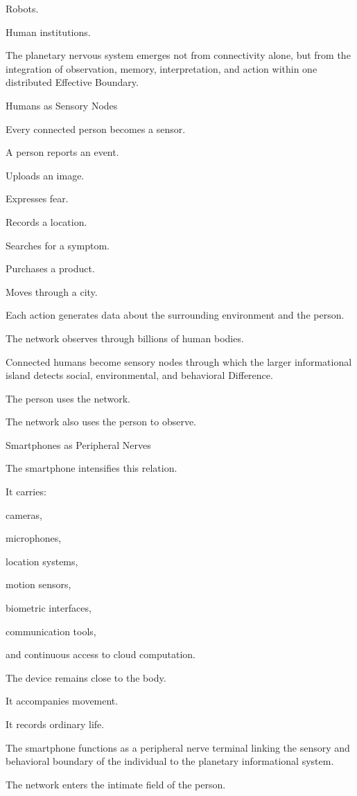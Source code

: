 Robots.

Human institutions.

The planetary nervous system emerges not from connectivity alone, but from the integration of observation, memory, interpretation, and action within one distributed Effective Boundary.

Humans as Sensory Nodes

Every connected person becomes a sensor.

A person reports an event.

Uploads an image.

Expresses fear.

Records a location.

Searches for a symptom.

Purchases a product.

Moves through a city.

Each action generates data about the surrounding environment and the person.

The network observes through billions of human bodies.

Connected humans become sensory nodes through which the larger informational island detects social, environmental, and behavioral Difference.

The person uses the network.

The network also uses the person to observe.

Smartphones as Peripheral Nerves

The smartphone intensifies this relation.

It carries:

cameras,

microphones,

location systems,

motion sensors,

biometric interfaces,

communication tools,

and continuous access to cloud computation.

The device remains close to the body.

It accompanies movement.

It records ordinary life.

The smartphone functions as a peripheral nerve terminal linking the sensory and behavioral boundary of the individual to the planetary informational system.

The network enters the intimate field of the person.

